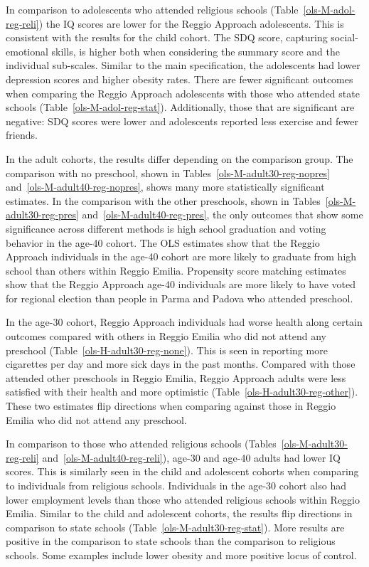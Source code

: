 In comparison to adolescents who attended religious schools (Table~\ref{ols-M-adol-reg-reli}) the IQ scores are lower for the Reggio Approach adolescents. This is consistent with the results for the child cohort. The SDQ score, capturing social-emotional skills, is higher both when considering the summary score and the individual sub-scales. Similar to the main specification, the adolescents had lower depression scores and higher obesity rates. There are fewer significant outcomes when comparing the Reggio Approach adolescents with those who attended state schools (Table~\ref{ols-M-adol-reg-stat}). Additionally, those that are significant are negative: SDQ scores were lower and adolescents reported less exercise and fewer friends.

In the adult cohorts, the results differ depending on the comparison group. The comparison with no preschool, shown in Tables~\ref{ols-M-adult30-reg-nopres} and~\ref{ols-M-adult40-reg-nopres}, shows many more statistically significant estimates. In the comparison with the other preschools, shown in Tables~\ref{ols-M-adult30-reg-pres} and~\ref{ols-M-adult40-reg-pres}, the only outcomes that show some significance across different methods is high school graduation and voting behavior in the age-40 cohort. The OLS estimates show that the Reggio Approach individuals in the age-40 cohort are more likely to graduate from high school than others within Reggio Emilia. Propensity score matching estimates show that the Reggio Approach age-40 individuals are more likely to have voted for regional election than people in Parma and Padova who attended preschool.

In the age-30 cohort, Reggio Approach individuals had worse health along certain outcomes compared with others in Reggio Emilia who did not attend any preschool (Table~\ref{ols-H-adult30-reg-none}). This is seen in reporting more cigarettes per day and more sick days in the past months. Compared with those attended other preschools in Reggio Emilia, Reggio Approach adults were less satisfied with their health and more optimistic (Table~\ref{ols-H-adult30-reg-other}). These two estimates flip directions when comparing against those in Reggio Emilia who did not attend any preschool. 

In comparison to those who attended religious schools (Tables~\ref{ols-M-adult30-reg-reli} and~\ref{ols-M-adult40-reg-reli}), age-30 and age-40 adults had lower IQ scores. This is similarly seen in the child and adolescent cohorts when comparing to individuals from religious schools. Individuals in the age-30 cohort also had lower employment levels than those who attended religious schools within Reggio Emilia. Similar to the child and adolescent cohorts, the results flip directions in comparison to state schools (Table~\ref{ols-M-adult30-reg-stat}). More results are positive in the comparison to state schools than the comparison to religious schools. Some examples include lower obesity and more positive locus of control.

